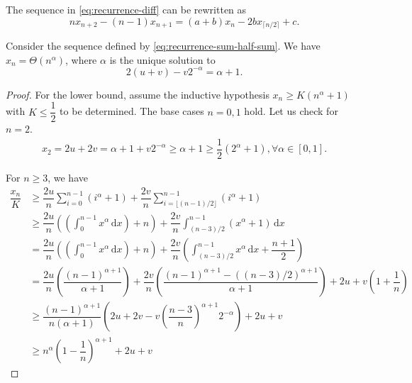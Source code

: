 \begin{lemma}
  The sequence in \eqref{eq:recurrence-diff} can be rewritten as
  \begin{equation}
    nx_{n+2} - (n-1)x_{n+1} = (a+b)x_n - 2b x_{\lceil n/2\rceil} + c.
  \end{equation}
\end{lemma}

\begin{proposition}
  Consider the sequence defined by \eqref{eq:recurrence-sum-half-sum}. We have $x_n = \Theta(n^{\alpha})$, where $\alpha$ is the unique solution to
  $$2(u+v) - v2^{-\alpha} = \alpha+1.$$
\end{proposition}

\begin{proof}
  For the lower bound, assume the inductive hypothesis $x_n \ge K(n^{\alpha}+1)$ with $K\le \dfrac{1}{2}$ to be determined. The base cases $n=0,1$ hold. Let us check for $n=2$.
  \begin{align*}
    x_2 = 2u + 2v = \alpha+1+v2^{-\alpha} \ge \alpha+1 \ge \dfrac{1}{2}(2^{\alpha}+1), \forall \alpha \in [0,1].
  \end{align*}

  For $n\ge 3$, we have
  \begin{align*}
    \dfrac{x_{n}}{K}
     & \ge \dfrac{2u}{n}\sum_{i=0}^{n-1}(i^{\alpha}+1) + \dfrac{2v}{n}\sum_{i=\lfloor (n-1)/2 \rfloor}^{n-1}(i^{\alpha}+1)                                                                       \\
     & \ge \dfrac{2u}{n}\left(\left(\int_{0}^{n-1}x^{\alpha}\,\mathrm{d}x\right)+n\right)  + \dfrac{2v}{n}\int_{(n-3)/2}^{n-1}(x^{\alpha}+1) \,\mathrm{d}x                                       \\
     & = \dfrac{2u}{n}\left(\left(\int_{0}^{n-1}x^{\alpha}\,\mathrm{d}x\right)+n\right)  + \dfrac{2v}{n}\left(\int_{(n-3)/2}^{n-1}x^{\alpha} \,\mathrm{d}x +\dfrac{n+1}{2}\right)                \\
     & = \dfrac{2u}{n}\left(\dfrac{(n-1)^{\alpha+1}}{\alpha+1} \right) + \dfrac{2v}{n}\left(\dfrac{(n-1)^{\alpha+1} - ((n-3)/2)^{\alpha+1}}{\alpha+1}\right) + 2u + v\left(1+\dfrac{1}{n}\right) \\
     & \ge \dfrac{(n-1)^{\alpha+1}}{n(\alpha+1)}\left(2u+2v - v\left(\dfrac{n-3}{n}\right)^{\alpha+1}2^{-\alpha}\right)+ 2u + v                                                                  \\
     & \ge n^{\alpha}\left(1-\dfrac{1}{n}\right)^{\alpha+1} + 2u+v
  \end{align*}


\end{proof}
